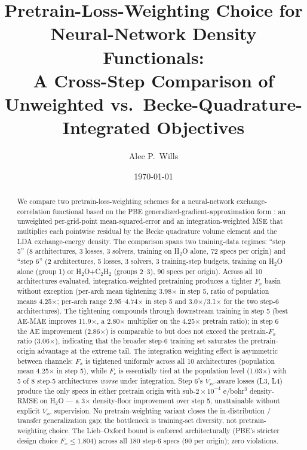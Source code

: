 \documentclass[11pt,letterpaper]{article}
\title{Pretrain-Loss-Weighting Choice for Neural-Network Density Functionals: \\
       A Cross-Step Comparison of Unweighted vs.\ Becke-Quadrature-Integrated Objectives}
\author{Alec P.\ Wills}
\date{\today}
\begin{document}
\maketitle

\begin{abstract}
We compare two pretrain-loss-weighting schemes for a neural-network exchange-correlation
functional based on the PBE generalized-gradient-approximation form
\citep{PerdewBurkeErnzerhof1996}: an unweighted per-grid-point mean-squared-error and an
integration-weighted MSE that multiplies each pointwise residual by the Becke quadrature
volume element \citep{Becke1988} and the LDA exchange-energy density. The comparison
spans two training-data regimes: ``step 5'' (8 architectures, 3 losses, 3 solvers,
training on H$_2$O alone, 72 specs per origin) and ``step 6'' (2 architectures, 5 losses,
3 solvers, 3 training-step budgets, training on H$_2$O alone (group 1) or
H$_2$O+C$_2$H$_2$ (groups 2--3), 90 specs per origin).
Across all 10 architectures evaluated, integration-weighted pretraining produces a tighter
$F_x$ basin without exception (per-arch mean tightening 3.98$\times$ in step 5, ratio of
population means 4.25$\times$; per-arch range 2.95--4.74$\times$ in step 5 and
3.0$\times$/3.1$\times$ for the two step-6 architectures). The tightening compounds through
downstream training in step 5 (best AE-MAE improves 11.9$\times$, a 2.80$\times$
multiplier on the 4.25$\times$ pretrain ratio); in step 6 the AE improvement (2.86$\times$)
is comparable to but does not exceed the pretrain-$F_x$ ratio (3.06$\times$), indicating
that the broader step-6 training set saturates the pretrain-origin advantage at the
extreme tail. The integration weighting effect is asymmetric between channels: $F_x$ is
tightened uniformly across all 10 architectures (population mean 4.25$\times$ in step 5),
while $F_c$ is essentially tied at the population level (1.03$\times$) with 5 of 8
step-5 architectures \emph{worse} under integration. Step 6's $V_{xc}$-aware losses
(L3, L4) produce the only specs in either pretrain origin with sub-$2\!\times\!10^{-4}$
e/bohr$^3$ density-RMSE on H$_2$O --- a 3$\times$ density-floor improvement over step 5,
unattainable without explicit $V_{xc}$ supervision. No
pretrain-weighting variant closes the in-distribution / transfer generalization gap; the
bottleneck is training-set diversity, not pretrain-weighting choice. The Lieb--Oxford bound
\citep{LiebOxford1981} is enforced architecturally (PBE's stricter design choice
$F_x \le 1.804$) across all 180 step-6 specs (90 per origin); zero violations.
\end{abstract}
\end{document}
